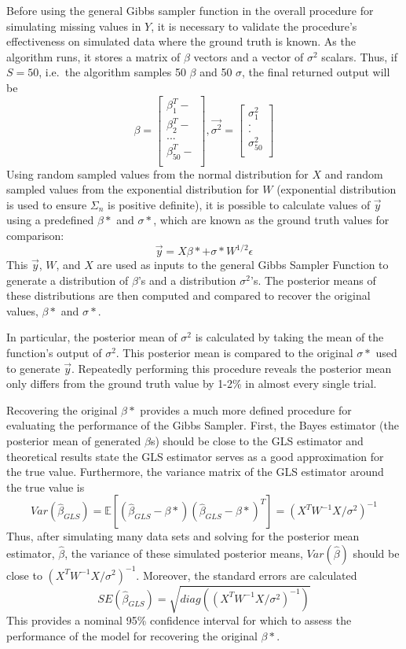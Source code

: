 \documentclass[12pt,twoside]{dukestatscithesis}
\theoremstyle{definition}
\theoremstyle{definition}
\theoremstyle{definition}
\theoremstyle{remark}
\begin{document}
Before using the general Gibbs sampler function in the overall procedure
for simulating missing values in \(Y\), it is necessary to validate the
procedure's effectiveness on simulated data where the ground truth is
known. As the algorithm runs, it stores a matrix of \(\beta\) vectors
and a vector of \(\sigma^2\) scalars. Thus, if \(S = 50\), i.e.~the
algorithm samples 50 \(\beta\) and 50 \(\sigma\), the final returned
output will be \[\beta =
  \begin{bmatrix}
    \beta_1^T- \\
    \beta_2^T- \\
    ... \\
    \beta_{50}^T- \\
  \end{bmatrix},
  \vec{\sigma^2} =
  \begin{bmatrix}
    \sigma_1^2 \\
    . \\
    . \\
    \sigma_{50}^2\\
  \end{bmatrix}\]
Using random sampled values from the normal distribution for \(X\) and
random sampled values from the exponential distribution for \(W\)
(exponential distribution is used to ensure \(\Sigma_n\) is positive
definite), it is possible to calculate values of \(\vec{y}\) using a
predefined \(\beta*\) and \(\sigma *\), which are known as the ground
truth values for comparison:
\[\vec{y} = X\beta * + \sigma * W^{1/2}\epsilon\] This \(\vec{y}\),
\(W\), and \(X\) are used as inputs to the general Gibbs Sampler
Function to generate a distribution of \(\beta\)'s and a distribution
\(\sigma^2\)'s. The posterior means of these distributions are then
computed and compared to recover the original values, \(\beta *\) and
\(\sigma *\).

In particular, the posterior mean of \(\sigma^2\) is calculated by
taking the mean of the function's output of \(\sigma^2\). This posterior
mean is compared to the original \(\sigma *\) used to generate
\(\vec{y}\). Repeatedly performing this procedure reveals the posterior
mean only differs from the ground truth value by 1-2\% in almost every
single trial.

Recovering the original \(\beta *\) provides a much more defined
procedure for evaluating the performance of the Gibbs Sampler. First,
the Bayes estimator (the posterior mean of generated \(\beta\)s) should
be close to the GLS estimator and theoretical results state the GLS
estimator serves as a good approximation for the true value.
Furthermore, the variance matrix of the GLS estimator around the true
value is
\[Var(\hat{\beta}_{GLS}) = \mathbb{E}[(\hat{\beta}_{GLS}-\beta * )(\hat{\beta}_{GLS}-\beta *)^T]=(X^T W^{-1}X/\sigma^2 )^{-1}\]
Thus, after simulating many data sets and solving for the posterior mean
estimator, \(\hat{\beta}\), the variance of these simulated posterior
means, \(Var(\hat{\beta})\) should be close to
\((X^T W^{-1}X/\sigma^2 )^{-1}\). Moreover, the standard errors are
calculated
\[SE(\hat{\beta}_{GLS}) = \sqrt{diag((X^T W^{-1}X/\sigma^2 )^{-1})}\]
This provides a nominal 95\% confidence interval for which to assess the
performance of the model for recovering the original \(\beta *\).
\end{document}
